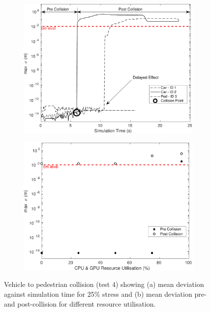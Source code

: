 \documentclass[letterpaper, 10 pt, journal, twoside]{IEEEtran}
\begin{document}
\begin{figure}[h]
    \centering
    \begin{subfigure}{.49\textwidth}
        \includegraphics[width=1\textwidth]{Other/Figures/CarsPeopleCollsionsCG25_V3.pdf}
        \caption{}
        \label{CarsPeopleCollsionsCG25}
    \end{subfigure}
    \begin{subfigure}{.49\textwidth}
        \includegraphics[width=1\textwidth]{Other/Figures/CarsPeopleCollisionPrePostV3.pdf}
        \caption{}
        \label{CarsPeopleCollisionPrePost}
    \end{subfigure}
    \caption{Vehicle to pedestrian collision (test 4) showing (a) mean deviation against simulation time for 25\% stress and (b) mean deviation pre- and post-collision for different resource utilisation.}
\end{figure}
\end{document}

